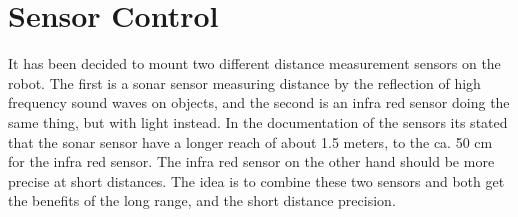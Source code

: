 
\section{Sensor Control}
\label{sec:sensorControl}

It has been decided to mount two different distance measurement sensors on the robot.
The first is a sonar sensor measuring distance by the reflection of high frequency sound waves on objects, and the second is an infra red sensor doing the same thing, but with light instead.
In the documentation of the sensors its stated that the sonar sensor have a longer reach of about 1.5 meters, to the ca. 50 cm for the infra red sensor.
The infra red sensor on the other hand should be more precise at short distances.
The idea is to combine these two sensors and both get the benefits of the long range, and the short distance precision.

\pagebreak